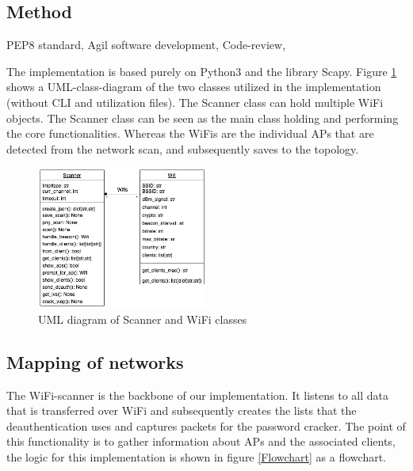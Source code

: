 \subsection{Method}
PEP8 standard, Agil software development, Code-review, 



The implementation is based purely on Python3 and the library Scapy. Figure \ref{UML_diagram} shows a UML-class-diagram of the two classes utilized in the implementation (without CLI and utilization files). The Scanner class can hold multiple WiFi objects. The Scanner class can be seen as the main class holding and performing the core functionalities. Whereas the WiFis are the individual APs that are detected from the network scan, and subsequently saves to the topology.
\begin{figure}[!htbp]
    \centering
    \includegraphics[width=0.5\textwidth]{Latex-Files/Billeder/Flowcharts/classes.png}
    \caption{UML diagram of Scanner and WiFi classes}
    \label{UML_diagram}
\end{figure}
\subsection{Mapping of networks}
The WiFi-scanner is the backbone of our implementation. It listens to all data that is transferred over WiFi and subsequently creates the lists that the deauthentication uses and captures packets for the password cracker. The point of this functionality is to gather information about APs and the associated clients, the logic for this implementation is shown in figure \ref{Flowchart} as a flowchart.

\newpage


